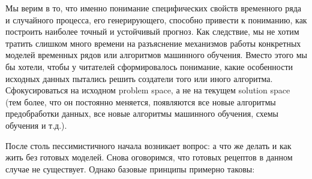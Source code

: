 Мы верим в то, что именно понимание специфических
свойств временного ряда и случайного процесса, его генерирующего,
способно привести к пониманию, как
построить наиболее точный и устойчивый прогноз. Как следствие, мы
не хотим тратить слишком много времени на разъяснение механизмов
работы конкретных моделей временных рядов или алгоритмов машинного
обучения. Вместо этого мы бы хотели, чтобы у читателей
сформировалось понимание, какие особенности исходных данных
пытались решить создатели того или иного алгоритма. Сфокусироваться
на исходном problem space, а не на текущем solution space
(тем более, что он постоянно меняется, появляются все новые алгоритмы
  предобработки данных, все новые алгоритмы машинного обучения, схемы
обучения и т.д.).

После столь пессимистичного начала возникает вопрос: а что же делать
и как жить без готовых моделей. Снова оговоримся, что готовых рецептов в
данном случае не существует. Однако базовые принципы примерно таковы:

